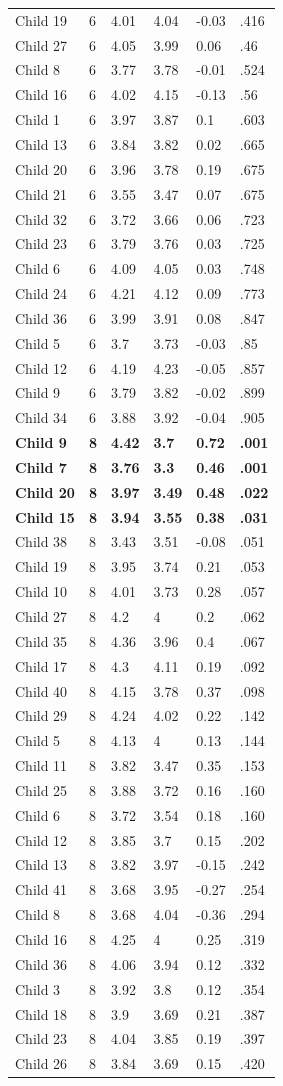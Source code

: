 \documentclass[openright,titlepage,12pt,a4paper]{book}
\begin{document}
\begin{longtable}[]{@{}llllll@{}}
Child 19 & 6 & 4.01 & 4.04 & -0.03 & .416\tabularnewline
Child 27 & 6 & 4.05 & 3.99 & 0.06 & .46\tabularnewline
Child 8 & 6 & 3.77 & 3.78 & -0.01 & .524\tabularnewline
Child 16 & 6 & 4.02 & 4.15 & -0.13 & .56\tabularnewline
Child 1 & 6 & 3.97 & 3.87 & 0.1 & .603\tabularnewline
Child 13 & 6 & 3.84 & 3.82 & 0.02 & .665\tabularnewline
Child 20 & 6 & 3.96 & 3.78 & 0.19 & .675\tabularnewline
Child 21 & 6 & 3.55 & 3.47 & 0.07 & .675\tabularnewline
Child 32 & 6 & 3.72 & 3.66 & 0.06 & .723\tabularnewline
Child 23 & 6 & 3.79 & 3.76 & 0.03 & .725\tabularnewline
Child 6 & 6 & 4.09 & 4.05 & 0.03 & .748\tabularnewline
Child 24 & 6 & 4.21 & 4.12 & 0.09 & .773\tabularnewline
Child 36 & 6 & 3.99 & 3.91 & 0.08 & .847\tabularnewline
Child 5 & 6 & 3.7 & 3.73 & -0.03 & .85\tabularnewline
Child 12 & 6 & 4.19 & 4.23 & -0.05 & .857\tabularnewline
Child 9 & 6 & 3.79 & 3.82 & -0.02 & .899\tabularnewline
Child 34 & 6 & 3.88 & 3.92 & -0.04 & .905\tabularnewline
\textbf{Child 9} & \textbf{8} & \textbf{4.42} & \textbf{3.7} & \textbf{0.72} & \textbf{.001}\tabularnewline
\textbf{Child 7} & \textbf{8} & \textbf{3.76} & \textbf{3.3} & \textbf{0.46} & \textbf{.001}\tabularnewline
\textbf{Child 20} & \textbf{8} & \textbf{3.97} & \textbf{3.49} & \textbf{0.48} & \textbf{.022}\tabularnewline
\textbf{Child 15} & \textbf{8} & \textbf{3.94} & \textbf{3.55} & \textbf{0.38} & \textbf{.031}\tabularnewline
Child 38 & 8 & 3.43 & 3.51 & -0.08 & .051\tabularnewline
Child 19 & 8 & 3.95 & 3.74 & 0.21 & .053\tabularnewline
Child 10 & 8 & 4.01 & 3.73 & 0.28 & .057\tabularnewline
Child 27 & 8 & 4.2 & 4 & 0.2 & .062\tabularnewline
Child 35 & 8 & 4.36 & 3.96 & 0.4 & .067\tabularnewline
Child 17 & 8 & 4.3 & 4.11 & 0.19 & .092\tabularnewline
Child 40 & 8 & 4.15 & 3.78 & 0.37 & .098\tabularnewline
Child 29 & 8 & 4.24 & 4.02 & 0.22 & .142\tabularnewline
Child 5 & 8 & 4.13 & 4 & 0.13 & .144\tabularnewline
Child 11 & 8 & 3.82 & 3.47 & 0.35 & .153\tabularnewline
Child 25 & 8 & 3.88 & 3.72 & 0.16 & .160\tabularnewline
Child 6 & 8 & 3.72 & 3.54 & 0.18 & .160\tabularnewline
Child 12 & 8 & 3.85 & 3.7 & 0.15 & .202\tabularnewline
Child 13 & 8 & 3.82 & 3.97 & -0.15 & .242\tabularnewline
Child 41 & 8 & 3.68 & 3.95 & -0.27 & .254\tabularnewline
Child 8 & 8 & 3.68 & 4.04 & -0.36 & .294\tabularnewline
Child 16 & 8 & 4.25 & 4 & 0.25 & .319\tabularnewline
Child 36 & 8 & 4.06 & 3.94 & 0.12 & .332\tabularnewline
Child 3 & 8 & 3.92 & 3.8 & 0.12 & .354\tabularnewline
Child 18 & 8 & 3.9 & 3.69 & 0.21 & .387\tabularnewline
Child 23 & 8 & 4.04 & 3.85 & 0.19 & .397\tabularnewline
Child 26 & 8 & 3.84 & 3.69 & 0.15 & .420\tabularnewline

\end{longtable}
\end{document}
